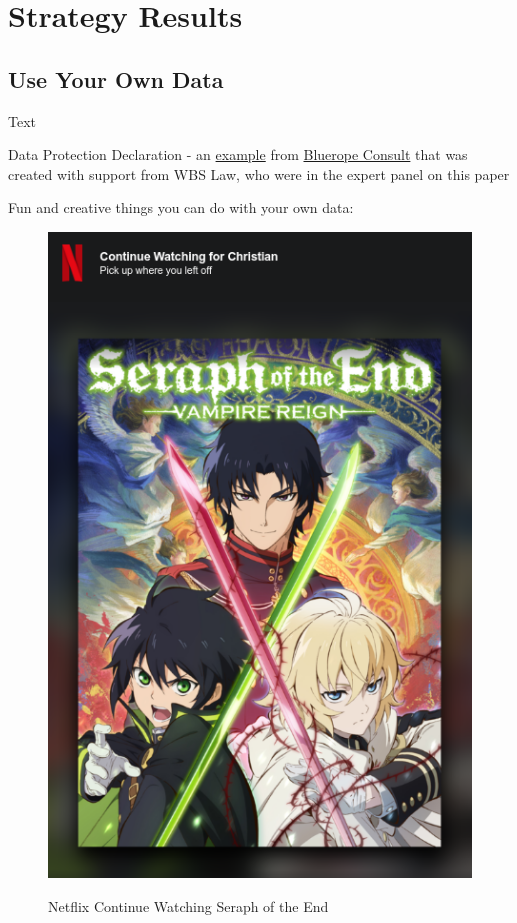 %
%

\pagebreak
\section{Strategy Results}

\onehalfspacing

\subsection{Use Your Own Data}

Text

Data Protection Declaration - an \href{https://blueropeconsultonline.de/datenschutz/}{example} from \href{https://blueropeconsultonline.de/}{Bluerope Consult} that was created with support from WBS Law, who were in the expert panel on this paper

Fun and creative things you can do with your own data:

\begin{figure}[H]
\centering
\caption {Netflix Continue Watching Seraph of the End}
\includegraphics[scale=0.6]{images/continue-seraph.png}
\label{fig:seraph}
\end{figure}


